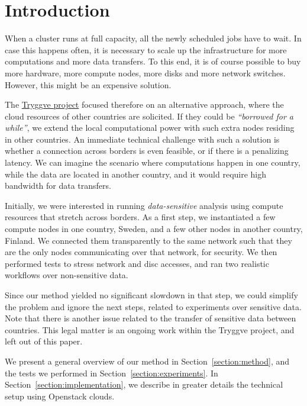 \section{Introduction}
\label{section:intro}

When a cluster runs at full capacity, all the newly scheduled jobs
have to wait. In case this happens often, it is necessary to scale up
the infrastructure for more computations and more data transfers. To
this end, it is of course possible to buy more hardware, \ie more
compute nodes, more disks and more network switches. However, this
might be an expensive solution.

The \href{https://wiki.neic.no/wiki/Tryggve}{Tryggve project} focused
therefore on an alternative approach, where the cloud resources of
other countries are solicited.
%
If they could be \emph{``borrowed for a while''}, we extend the local
computational power with such extra nodes residing in other countries.
%
An immediate technical challenge with such a solution is whether a
connection across borders is even feasible, or if there is a
penalizing latency. We can imagine the scenario where computations
happen in one country, while the data are located in another country,
and it would require high bandwidth for data transfers.

Initially, we were interested in running \emph{data-sensitive}
analysis using compute resources that stretch across borders.
%
As a first step, we instantiated a few compute nodes in one country,
Sweden, and a few other nodes in another country, Finland. We
connected them transparently to the same network such that they are
the only nodes communicating over that network, for security. We then
performed tests to stress network and disc accesses, and ran two
realistic workflows over non-sensitive data.

Since our method yielded no significant slowdown in that step, we
could simplify the problem and ignore the next steps, related to
experiments over sensitive data.
%
Note that there is another issue related to the transfer of sensitive
data between countries. This legal matter is an ongoing work within
the Tryggve project, and left out of this paper.

We present a general overview of our method in
Section~\ref{section:method}, and the tests we performed in
Section~\ref{section:experiments}.
%
In Section~\ref{section:implementation}, we describe in greater
details the technical setup using Openstack clouds.
